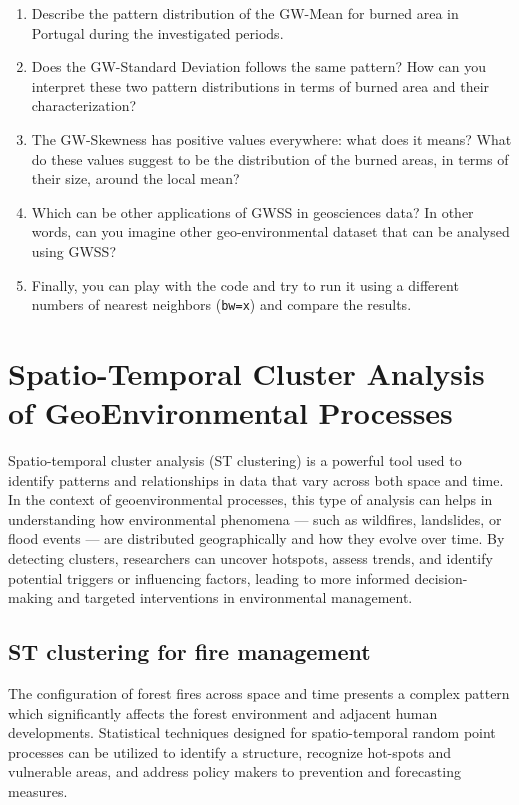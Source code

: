 \documentclass[
]{article}
\begin{document}
\begin{enumerate}
\def\labelenumi{\arabic{enumi})}
\item
  Describe the pattern distribution of the GW-Mean for burned area in Portugal during the investigated periods.
\item
  Does the GW-Standard Deviation follows the same pattern? How can you interpret these two pattern distributions in terms of burned area and their characterization?
\item
  The GW-Skewness has positive values everywhere: what does it means? What do these values suggest to be the distribution of the burned areas, in terms of their size, around the local mean?
\item
  Which can be other applications of GWSS in geosciences data? In other words, can you imagine other geo-environmental dataset that can be analysed using GWSS?
\item
  Finally, you can play with the code and try to run it using a different numbers of nearest neighbors (\texttt{bw=x}) and compare the results.
\end{enumerate}

\section{Spatio-Temporal Cluster Analysis of GeoEnvironmental Processes}\label{kde}

Spatio-temporal cluster analysis (ST clustering) is a powerful tool used to identify patterns and relationships in data that vary across both space and time.
In the context of geoenvironmental processes, this type of analysis can helps in understanding how environmental phenomena --- such as wildfires, landslides, or flood events --- are distributed geographically and how they evolve over time.
By detecting clusters, researchers can uncover hotspots, assess trends, and identify potential triggers or influencing factors, leading to more informed decision-making and targeted interventions in environmental management.

\subsection{ST clustering for fire management}\label{st-clustering-for-fire-management}

The configuration of forest fires across space and time presents a complex pattern which significantly affects the forest environment and adjacent human developments.
Statistical techniques designed for spatio-temporal random point processes can be utilized to identify a structure, recognize hot-spots and vulnerable areas, and address policy makers to prevention and forecasting measures.
\end{document}
